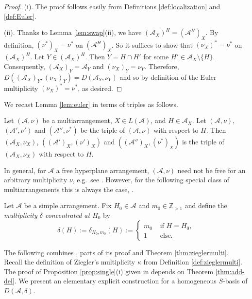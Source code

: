 \begin{proof}
(i).
The proof follows easily 
from Definitions \ref{def:localization} and \ref{def:Euler}.

(ii).
Thanks to Lemma \ref{lem:swap}(ii), we have $({{\mathcal A}}_X)^H = ({{\mathcal A}}^H)_X$.
By definition,  $(\nu^*)_X = \nu^*$ on $({{\mathcal A}}^H)_X$.
So it suffices to show that $(\nu_X)^*  = \nu^*$
on $({{\mathcal A}}_X)^H$. 
Let $Y \in ({{\mathcal A}}_X)^H$. Then $Y = H \cap H'$ for some $H' \in {{\mathcal A}}_X \setminus\{H\}$.
Consequently, $({{\mathcal A}}_X)_Y = {{\mathcal A}}_Y$ and $(\nu_X)_Y = \nu_Y$.
Therefore, $D(({{\mathcal A}}_X)_Y, (\nu_X)_Y) = D({{\mathcal A}}_Y, \nu_Y)$ and 
so by definition of the Euler multiplicity $(\nu_X)^* = \nu^*$,
as desired. 
\end{proof}

We recast Lemma \ref{lem:euler} in terms of triples as follows.

\begin{corollary}
\label{cor:euler}
Let $({{\mathcal A}}, \nu)$ be a multiarrangement, $X \in L({{\mathcal A}})$, and $H \in {{\mathcal A}}_X$.
Let $({{\mathcal A}}, \nu)$, $({{\mathcal A}}', \nu')$ and $({{\mathcal A}}'', \nu^*)$ be the triple 
of $({{\mathcal A}}, \nu)$ with respect to $H$. Then 
$({{\mathcal A}}_X, \nu_X)$, $(({{\mathcal A}}')_X, (\nu')_X)$ and 
$(({{\mathcal A}}'')_X, (\nu^*)_X)$ is the triple of 
 $({{\mathcal A}}_X, \nu_X)$ with respect to $H$.
\end{corollary}

In general, for ${{\mathcal A}}$ a free hyperplane arrangement, $({{\mathcal A}}, \nu)$ need not be
free for an arbitrary multiplicity $\nu$, 
e.g.\ see \cite[Ex.\ 14]{ziegler:multiarrangements}.
However, for the following 
special class of multiarrangements this is always the case,
\cite[Prop.\ 5.2]{abeteraowakefield:euler}.

\begin{defn}
\label{def:single}
Let ${{\mathcal A}}$ be a simple arrangement.
Fix $H_0 \in {{\mathcal A}}$ and $m_0 \in {{\mathbb Z}}_{>1}$ and 
define the 
\emph{multiplicity $\delta$ concentrated at $H_0$}
by
\[
\delta(H) := \delta_{H_0,m_0}(H) := 
\begin{cases}
m_0 & \text{ if } H = H_0,\\
1   & \text{ else}.
\end{cases}
\]
\end{defn}

The following combines
\cite[Prop.\ 5.2]{abeteraowakefield:euler}, parts of its proof
and Theorem \ref{thm:zieglermulti}. Recall the definition of 
Ziegler's multiplicity $\kappa$ from Definition \ref{def:zieglermulti}.
The proof of Proposition \ref{prop:single}(i)
given in \cite{abeteraowakefield:euler} 
depends on Theorem \ref{thm:add-del}.
We present an elementary explicit 
construction for a homogeneous 
$S$-basis of $D({{\mathcal A}}, \delta)$.

